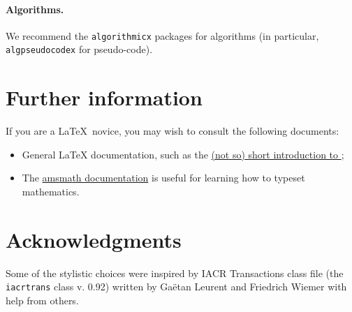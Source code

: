 \documentclass[journal=cic,version=preprint]{iacrj}
\begin{document}
\paragraph{Algorithms.}
We recommend the \texttt{algorithmicx} packages for algorithms (in
particular, \texttt{algpseudocodex} for pseudo-code).

\section{Further information}
If you are a \LaTeX\ novice, you may wish to consult the following documents:
\begin{itemize}
\item General \LaTeX{} documentation, such as the
  \href{http://mirrors.ctan.org/info/lshort/english/lshort.pdf}{(not
    so) short introduction to \LaTeXe};
\item The
  \href{https://mirror.mwt.me/ctan/macros/latex/required/amsmath/amsldoc.pdf}{amsmath
    documentation} is useful for learning how to typeset mathematics.
\end{itemize}

\section*{Acknowledgments}
Some of the stylistic choices were inspired by IACR Transactions class
file (the \texttt{iacrtrans} class v. 0.92) written by Ga{\"e}tan
Leurent and Friedrich Wiemer with help from others.


\end{document}
